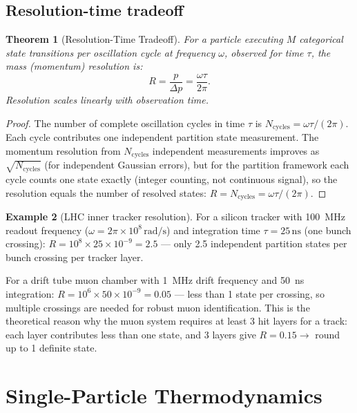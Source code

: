 \documentclass[twocolumn,10pt,a4paper]{article}
\theoremstyle{thmstyle}
\newtheorem{theorem}{Theorem}[section]
\theoremstyle{definition}
\newtheorem{example}[theorem]{Example}
\theoremstyle{remark}
\begin{document}
\subsection{Resolution-time tradeoff}

\begin{theorem}[Resolution-Time Tradeoff]
\label{thm:resolution}
For a particle executing $M$ categorical state transitions per oscillation
cycle at frequency $\omega$, observed for time $\tau$, the mass (momentum)
resolution is:
\begin{equation}
R = \frac{p}{\Delta p} = \frac{\omega\tau}{2\pi}.
\label{eq:resolution}
\end{equation}
Resolution scales linearly with observation time.
\end{theorem}

\begin{proof}
The number of complete oscillation cycles in time $\tau$ is
$N_{\mathrm{cycles}} = \omega\tau/(2\pi)$.
Each cycle contributes one independent partition state measurement.
The momentum resolution from $N_{\mathrm{cycles}}$ independent measurements
improves as $\sqrt{N_{\mathrm{cycles}}}$ (for independent Gaussian errors),
but for the partition framework each cycle counts one state exactly
(integer counting, not continuous signal), so the resolution equals the
number of resolved states:
$R = N_{\mathrm{cycles}} = \omega\tau/(2\pi)$.
\end{proof}

\begin{example}[LHC inner tracker resolution]
For a silicon tracker with 100~MHz readout frequency ($\omega = 2\pi \times 10^8\,\mathrm{rad/s}$)
and integration time $\tau = 25\,\mathrm{ns}$ (one bunch crossing):
$R = 10^8 \times 25\times 10^{-9} = 2.5$ — only 2.5 independent partition states
per bunch crossing per tracker layer.

For a drift tube muon chamber with 1~MHz drift frequency and 50~ns integration:
$R = 10^6 \times 50\times 10^{-9} = 0.05$ — less than 1 state per crossing,
so multiple crossings are needed for robust muon identification.
This is the theoretical reason why the muon system requires at least
3 hit layers for a track: each layer contributes less than one state,
and 3 layers give $R = 0.15 \to$ round up to 1 definite state.
\end{example}

\section{Single-Particle Thermodynamics}
\label{sec:thermo}
\end{document}
